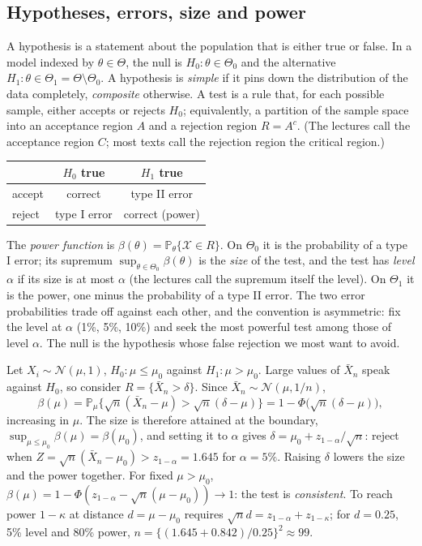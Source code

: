 \documentclass[11pt,a4paper]{article}
\renewcommand{\P}{\mathbb{P}}
\newcommand{\N}{\mathcal{N}}
\newcommand{\Xbar}{\bar X_n}
\begin{document}
\subsection{Hypotheses, errors, size and power}

A hypothesis is a statement about the population that is either true or false. In a model indexed by $\theta\in\Theta$, the null is $H_0:\theta\in\Theta_0$ and the alternative $H_1:\theta\in\Theta_1=\Theta\setminus\Theta_0$. A hypothesis is \emph{simple} if it pins down the distribution of the data completely, \emph{composite} otherwise. A test is a rule that, for each possible sample, either accepts or rejects $H_0$; equivalently, a partition of the sample space into an acceptance region $A$ and a rejection region $R=A^c$. (The lectures call the acceptance region $C$; most texts call the rejection region the critical region.)

\begin{center}
\small
\begin{tabular}{@{}lcc@{}}
\toprule
& $H_0$ true & $H_1$ true\\
\midrule
accept & correct & type II error\\
reject & type I error & correct (power)\\
\bottomrule
\end{tabular}
\end{center}

The \emph{power function} is $\beta(\theta)=\P_\theta\{\mathcal X\in R\}$. On $\Theta_0$ it is the probability of a type I error; its supremum $\sup_{\theta\in\Theta_0}\beta(\theta)$ is the \emph{size} of the test, and the test has \emph{level} $\alpha$ if its size is at most $\alpha$ (the lectures call the supremum itself the level). On $\Theta_1$ it is the power, one minus the probability of a type II error. The two error probabilities trade off against each other, and the convention is asymmetric: fix the level at $\alpha$ (1\%, 5\%, 10\%) and seek the most powerful test among those of level $\alpha$. The null is the hypothesis whose false rejection we most want to avoid.

\begin{example}\label{ex:onesided}
Let $X_i\sim\N(\mu,1)$, $H_0:\mu\le\mu_0$ against $H_1:\mu>\mu_0$. Large values of $\Xbar$ speak against $H_0$, so consider $R=\{\Xbar>\delta\}$. Since $\Xbar\sim\N(\mu,1/n)$,
\[
\beta(\mu)=\P_\mu\{\sqrt n(\Xbar-\mu)>\sqrt n(\delta-\mu)\}=1-\Phi\big(\sqrt n(\delta-\mu)\big),
\]
increasing in $\mu$. The size is therefore attained at the boundary, $\sup_{\mu\le\mu_0}\beta(\mu)=\beta(\mu_0)$, and setting it to $\alpha$ gives $\delta=\mu_0+z_{1-\alpha}/\sqrt n$: reject when $Z=\sqrt n(\Xbar-\mu_0)>z_{1-\alpha}=1.645$ for $\alpha=5\%$. Raising $\delta$ lowers the size and the power together. For fixed $\mu>\mu_0$, $\beta(\mu)=1-\Phi(z_{1-\alpha}-\sqrt n(\mu-\mu_0))\to1$: the test is \emph{consistent}. To reach power $1-\kappa$ at distance $d=\mu-\mu_0$ requires $\sqrt nd=z_{1-\alpha}+z_{1-\kappa}$; for $d=0.25$, 5\% level and 80\% power, $n=\{(1.645+0.842)/0.25\}^2\approx99$.
\end{example}
\end{document}
